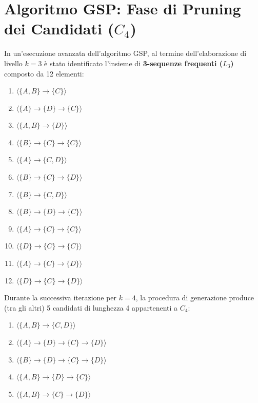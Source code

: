 \FloatBarrier
\section{Algoritmo GSP: Fase di Pruning dei Candidati (\texorpdfstring{$C_4$}{C4})}
\label{sec:dm-gsp-pruning-exercise}

In un'esecuzione avanzata dell'algoritmo GSP, al termine dell'elaborazione di livello $k=3$ è stato identificato l'insieme di \textbf{3-sequenze frequenti ($L_3$)} composto da 12 elementi:
\begin{enumerate}[label=\textbf{\arabic*.}]
    \item $\langle \{A, B\} \to \{C\} \rangle$
    \item $\langle \{A\} \to \{D\} \to \{C\} \rangle$
    \item $\langle \{A, B\} \to \{D\} \rangle$
    \item $\langle \{B\} \to \{C\} \to \{C\} \rangle$
    \item $\langle \{A\} \to \{C, D\} \rangle$
    \item $\langle \{B\} \to \{C\} \to \{D\} \rangle$
    \item $\langle \{B\} \to \{C, D\} \rangle$
    \item $\langle \{B\} \to \{D\} \to \{C\} \rangle$
    \item $\langle \{A\} \to \{C\} \to \{C\} \rangle$
    \item $\langle \{D\} \to \{C\} \to \{C\} \rangle$
    \item $\langle \{A\} \to \{C\} \to \{D\} \rangle$
    \item $\langle \{D\} \to \{C\} \to \{D\} \rangle$
\end{enumerate}

Durante la successiva iterazione per $k=4$, la procedura di generazione produce (tra gli altri) 5 candidati di lunghezza 4 appartenenti a $C_4$:
\begin{enumerate}[label=\textbf{C\arabic*.}]
    \item $\langle \{A, B\} \to \{C, D\} \rangle$
    \item $\langle \{A\} \to \{D\} \to \{C\} \to \{D\} \rangle$
    \item $\langle \{B\} \to \{D\} \to \{C\} \to \{D\} \rangle$
    \item $\langle \{A, B\} \to \{D\} \to \{C\} \rangle$
    \item $\langle \{A, B\} \to \{C\} \to \{D\} \rangle$
\end{enumerate}


